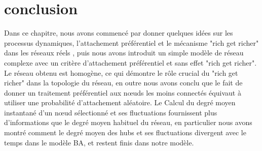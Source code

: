 \section{conclusion}

Dans ce chapitre, nous avons commencé par donner quelques idées sur les processus dynamiques, l'attachement préférentiel et le mécanisme "rich get richer" dans les réseaux réels , puis nous avons introduit un simple modèle de réseau complexe avec un critère d'attachement préférentiel et sans effet "rich get richer". Le réseau obtenu est homogène, ce qui démontre le rôle crucial du "rich get richer" dans la topologie du réseau, en outre nous avons conclu que le fait de donner un traitement préférentiel aux nœuds les moins connectés équivaut à utiliser une probabilité d'attachement aléatoire. Le Calcul du degré moyen instantané d'un nœud sélectionné et ses fluctuations fournissent plus d'informations que le degré moyen habituel du réseau, en particulier nous avons montré comment le degré moyen des hubs et ses fluctuations divergent avec le temps dans le modèle BA, et restent finis dans notre modèle.
